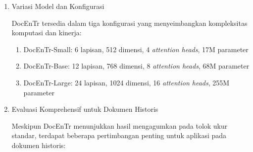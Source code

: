 \begin{enumerate}[leftmargin=*, labelindent=0pt, itemsep=1ex, topsep=0pt]
\begin{enumerate}[leftmargin=1.5em, labelsep=0.5em, itemindent=0pt, label=\alph*., topsep=0pt, parsep=0pt, itemsep=0pt]
      \item Tanpa \textit{Inductive Bias}: \mbox{}\\[0.1em]
            Tanpa \textit{inductive bias} konvolusional, model dapat mempelajari representasi yang lebih fleksibel dan tidak terbatas pada pola lokal.

      \item Kinerja Superior: \mbox{}\\[0.1em]
            Pada tolok ukur DIBCO, DocEnTr mencapai kinerja \textit{state-of-the-art} dengan PSNR signifikan lebih tinggi dibandingkan metode berbasis CNN.
\end{enumerate}

\item Variasi Model dan Konfigurasi

DocEnTr tersedia dalam tiga konfigurasi yang menyeimbangkan kompleksitas komputasi dan kinerja:

\begin{enumerate}[leftmargin=1.5em, labelsep=0.5em, itemindent=0pt, label=\alph*., topsep=0pt, parsep=0pt, itemsep=0pt]
      \item DocEnTr-Small: 6 lapisan, 512 dimensi, 4 \textit{attention heads}, 17M parameter
      \item DocEnTr-Base: 12 lapisan, 768 dimensi, 8 \textit{attention heads}, 68M parameter
      \item DocEnTr-Large: 24 lapisan, 1024 dimensi, 16 \textit{attention heads}, 255M parameter
\end{enumerate}

\item Evaluasi Komprehensif untuk Dokumen Historis

Meskipun DocEnTr menunjukkan hasil mengagumkan pada tolok ukur standar, terdapat beberapa pertimbangan penting untuk aplikasi pada dokumen historis:


\end{enumerate}
